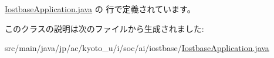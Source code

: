 \hyperlink{_iostbase_application_8java_source}{Iostbase\-Application.\-java} の  行で定義されています。



このクラスの説明は次のファイルから生成されました\-:\begin{DoxyCompactItemize}
\item 
src/main/java/jp/ac/kyoto\-\_\-u/i/soc/ai/iostbase/\hyperlink{_iostbase_application_8java}{Iostbase\-Application.\-java}\end{DoxyCompactItemize}
